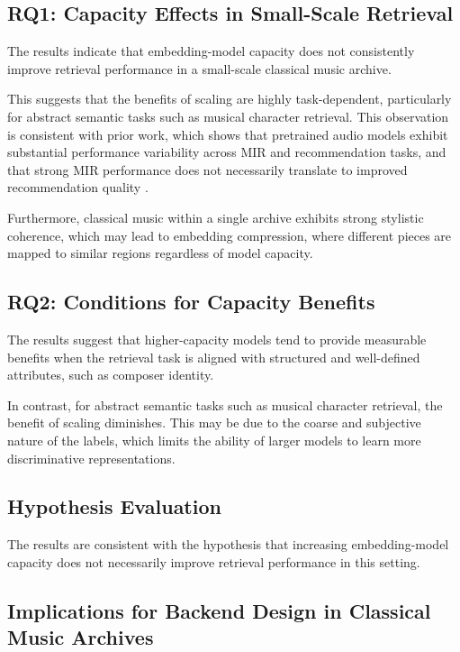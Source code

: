 \documentclass{article}
\begin{document}
\subsection{RQ1: Capacity Effects in Small-Scale Retrieval}

The results indicate that embedding-model capacity does not consistently improve retrieval performance in a small-scale classical music archive. 

This suggests that the benefits of scaling are highly task-dependent, particularly for abstract semantic tasks such as musical character retrieval. 
This observation is consistent with prior work, which shows that pretrained audio models exhibit substantial performance variability across MIR and recommendation tasks, and that strong MIR performance does not necessarily translate to improved recommendation quality \cite{tamm2024}.

Furthermore, classical music within a single archive exhibits strong stylistic coherence,
which may lead to embedding compression, where different pieces are mapped to similar regions
regardless of model capacity.

\subsection{RQ2: Conditions for Capacity Benefits}

The results suggest that higher-capacity models tend to provide measurable benefits when the retrieval task is aligned with structured and well-defined attributes, such as composer identity.

In contrast, for abstract semantic tasks such as musical character retrieval,
the benefit of scaling diminishes.
This may be due to the coarse and subjective nature of the labels,
which limits the ability of larger models to learn more discriminative representations.

\subsection{Hypothesis Evaluation}

The results are consistent with the hypothesis that increasing embedding-model capacity does not necessarily improve retrieval performance in this setting.

\subsection{Implications for Backend Design in Classical Music Archives}
\end{document}
